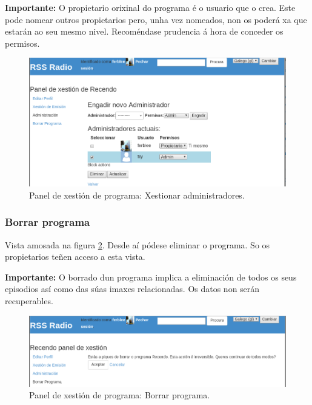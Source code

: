 \textbf{Importante:} O propietario orixinal do programa é o usuario que o crea. Este pode nomear outros propietarios pero, unha vez nomeados, non os poderá  xa que estarán ao seu mesmo nivel. Recoméndase prudencia á hora de conceder os permisos.

\begin{figure}[h]
	\centering
	\includegraphics[scale=0.43,keepaspectratio=true]{./images/usermanual/um-edprogram3.png}
	\caption{Panel de xestión de programa: Xestionar administradores.}
	\label{fig:um-edprogram3}
\end{figure}


\subsubsection{Borrar programa}

Vista amosada na figura \ref{fig:um-edprogram4}. Desde aí pódese eliminar o programa. So os propietarios teñen acceso a esta vista.

\textbf{Importante:} O borrado dun programa implica a eliminación de todos os seus episodios así como das súas imaxes relacionadas. Os datos non serán recuperables.

\begin{figure}[h]
	\centering
	\includegraphics[scale=0.43,keepaspectratio=true]{./images/usermanual/um-edprogram4.png}
	\caption{Panel de xestión de programa: Borrar programa.}
	\label{fig:um-edprogram4}
\end{figure}